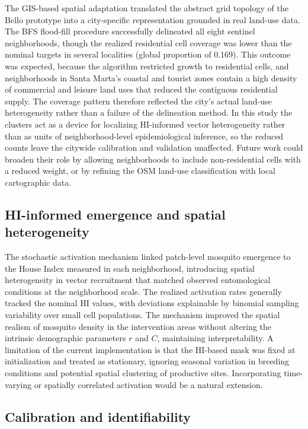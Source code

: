 \documentclass[applsci,article,accept,pdftex,moreauthors]{Definitions/mdpi}
\begin{document}
The GIS-based spatial adaptation translated the abstract grid topology of the Bello prototype into a city-specific representation grounded in real land-use data. The BFS flood-fill procedure successfully delineated all eight sentinel neighborhoods, though the realized residential cell coverage was lower than the nominal targets in several localities (global proportion of 0.169). This outcome was expected, because the algorithm restricted growth to residential cells, and neighborhoods in Santa Marta's coastal and tourist zones contain a high density of commercial and leisure land uses that reduced the contiguous residential supply. The coverage pattern therefore reflected the city's actual land-use heterogeneity rather than a failure of the delineation method. In this study the clusters act as a device for localizing HI-informed vector heterogeneity rather than as units of neighborhood-level epidemiological inference, so the reduced counts leave the citywide calibration and validation unaffected. Future work could broaden their role by allowing neighborhoods to include non-residential cells with a reduced weight, or by refining the OSM land-use classification with local cartographic data.

\subsection{HI-informed emergence and spatial heterogeneity}

The stochastic activation mechanism linked patch-level mosquito emergence to the House Index measured in each neighborhood, introducing spatial heterogeneity in vector recruitment that matched observed entomological conditions at the neighborhood scale. The realized activation rates generally tracked the nominal HI values, with deviations explainable by binomial sampling variability over small cell populations. The mechanism improved the spatial realism of mosquito density in the intervention areas without altering the intrinsic demographic parameters $r$ and $C$, maintaining interpretability. A limitation of the current implementation is that the HI-based mask was fixed at initialization and treated as stationary, ignoring seasonal variation in breeding conditions and potential spatial clustering of productive sites. Incorporating time-varying or spatially correlated activation would be a natural extension.

\subsection{Calibration and identifiability}
\end{document}
